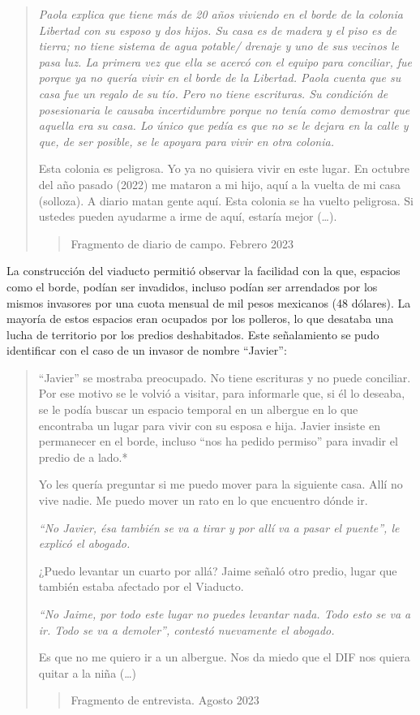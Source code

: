 \documentclass[
  spanish,
  11pt,
  a4paper,
]{scrbook}
\begin{document}
\begin{quote}
\emph{Paola explica que tiene más de 20 años viviendo en el borde de la
colonia Libertad con su esposo y dos hijos. Su casa es de madera y el
piso es de tierra; no tiene sistema de agua potable/ drenaje y uno de
sus vecinos le pasa luz. La primera vez que ella se acercó con el equipo
para conciliar, fue porque ya no quería vivir en el borde de la
Libertad. Paola cuenta que su casa fue un regalo de su tío. Pero no
tiene escrituras. Su condición de posesionaria le causaba incertidumbre
porque no tenía como demostrar que aquella era su casa. Lo único que
pedía es que no se le dejara en la calle y que, de ser posible, se le
apoyara para vivir en otra colonia.}

Esta colonia es peligrosa. Yo ya no quisiera vivir en este lugar. En
octubre del año pasado (2022) me mataron a mi hijo, aquí a la vuelta de
mi casa (solloza). A diario matan gente aquí. Esta colonia se ha vuelto
peligrosa. Si ustedes pueden ayudarme a irme de aquí, estaría mejor
(\ldots).

\begin{quote}
Fragmento de diario de campo. Febrero 2023
\end{quote}
\end{quote}

La construcción del viaducto permitió observar la facilidad con la que,
espacios como el borde, podían ser invadidos, incluso podían ser
arrendados por los mismos invasores por una cuota mensual de mil pesos
mexicanos (48 dólares). La mayoría de estos espacios eran ocupados por
los polleros, lo que desataba una lucha de territorio por los predios
deshabitados. Este señalamiento se pudo identificar con el caso de un
invasor de nombre ``Javier'':

\begin{quote}
``Javier'' se mostraba preocupado. No tiene escrituras y no puede
conciliar. Por ese motivo se le volvió a visitar, para informarle que,
si él lo deseaba, se le podía buscar un espacio temporal en un albergue
en lo que encontraba un lugar para vivir con su esposa e hija. Javier
insiste en permanecer en el borde, incluso ``nos ha pedido permiso''
para invadir el predio de a lado.*

Yo les quería preguntar si me puedo mover para la siguiente casa. Allí
no vive nadie. Me puedo mover un rato en lo que encuentro dónde ir.

\emph{``No Javier, ésa también se va a tirar y por allí va a pasar el
puente'', le explicó el abogado.}

¿Puedo levantar un cuarto por allá? Jaime señaló otro predio, lugar que
también estaba afectado por el Viaducto.

\emph{``No Jaime, por todo este lugar no puedes levantar nada. Todo esto
se va a ir. Todo se va a demoler'', contestó nuevamente el abogado.}

Es que no me quiero ir a un albergue. Nos da miedo que el DIF nos quiera
quitar a la niña (\ldots)

\begin{quote}
Fragmento de entrevista. Agosto 2023
\end{quote}
\end{quote}
\end{document}
